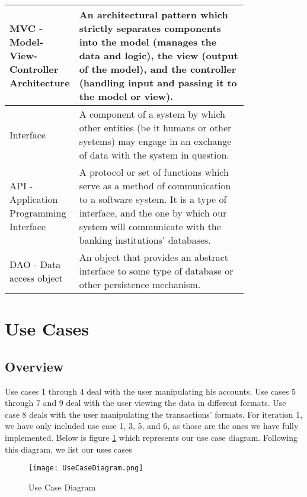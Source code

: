 \documentclass[11pt]{article}
\newcounter{use case ID}
\begin{document}
\begin{table}[H]
\begin{center}
{\begin{tabular}{|l|p{0.8\linewidth}|}
\hline
MVC - Model-View-Controller Architecture & An architectural pattern which strictly separates components into the model (manages the data and logic), the view (output of the model), and the controller (handling input and passing it to the model or view).\\
\hline
Interface & A component of a system by which other entities (be it humans or other systems) may engage in an exchange of data with the system in question. \\
\hline
API - Application Programming Interface & A protocol or set of functions which serve as a method of communication to a software system. It is a type of interface, and the one by which our system will communicate with the banking institutions' databases. \\
\hline
DAO - Data access object & An object that provides an abstract interface to some type of database or other persistence mechanism.\\
\hline

\end{tabular}}
\end{center}
\end{table}

\clearpage


\section{Use Cases}
\subsection{Overview}
Use cases 1 through 4 deal with the user manipulating his accounts. Use cases 5 through 7 and 9 deal with the user viewing the data in different formats. Use case 8 deals with the user manipulating the transactions' formats. For iteration 1, we have only included use case 1, 3, 5, and 6, as those are the ones we have fully implemented. Below is figure \ref{fig:use-case-diagram} which represents our use case diagram. Following this diagram, we list our uses cases

\begin{figure}[htbp]
\texttt{[image: UseCaseDiagram.png]}
\caption{Use Case Diagram}
\label{fig:use-case-diagram}
\end{figure}
\end{document}
